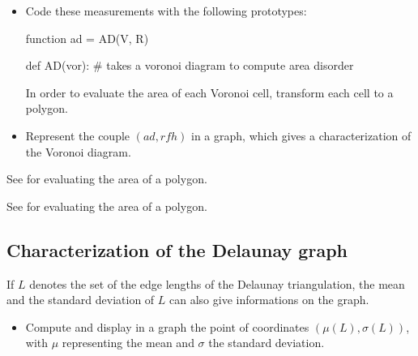 \begin{qbox}
 \begin{itemize}
  \item Code these measurements with the following prototypes:
  \begin{matlab}
function ad = AD(V, R)
  \end{matlab}
  
  \begin{python}
def AD(vor):
# takes a voronoi diagram to compute area disorder
  \end{python}
  
  In order to evaluate the area of each Voronoi cell, transform each cell to a polygon. 

\item Represent the couple $(ad,rfh)$ in a graph, which gives a characterization of the Voronoi diagram.
 \end{itemize}
\end{qbox}

\begin{mcomment}
\begin{mremark}
See  for evaluating the area of a polygon.
\end{mremark}
\end{mcomment}

\begin{pcomment}
\begin{premark}
See  for evaluating the area of a polygon.
\end{premark}
\end{pcomment}


\subsection{Characterization of the Delaunay graph}
If $L$ denotes the set of the edge lengths of the Delaunay triangulation, the mean and the standard deviation of $L$ 
can also give informations on the graph.
\begin{qbox}
 \begin{itemize}
  \item Compute and display in a graph the point of coordinates $(\mu(L), \sigma(L))$, with $\mu$ representing the mean 
  and $\sigma$ the standard deviation.
 \end{itemize}

\end{qbox}


